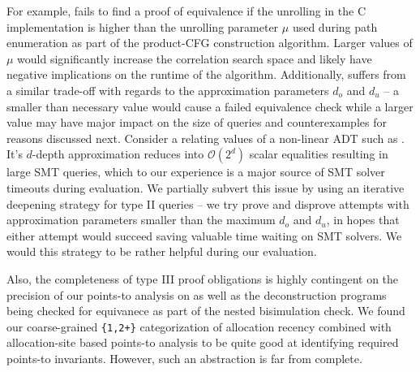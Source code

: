 For example, \toolName{} fails to find a proof of equivalence if the unrolling
in the C implementation is higher than the unrolling parameter $\mu$ used during path
enumeration as part of the product-CFG construction algorithm.
Larger values of $\mu$ would significantly increase the correlation search space and likely
have negative implications on the runtime of the algorithm.
Additionally, \toolName{} suffers from a similar trade-off with regards to the approximation parameters $d_o$ and $d_u$
-- a smaller than necessary value would cause a failed equivalence check while a larger value may
have major impact on the size of queries and counterexamples for reasons discussed next.
Consider a \recursiveRelation{} relating values of a non-linear ADT such as .
It's $d$-depth approximation reduces into $\mathcal{O}(2^d)$ scalar equalities resulting in large SMT queries,
which to our experience is a major source of SMT solver timeouts during evaluation.
We partially subvert this issue by using an iterative deepening strategy for type II queries --
we try prove and disprove attempts with approximation parameters smaller than the maximum $d_o$ and $d_u$,
in hopes that either attempt would succeed saving valuable
time waiting on SMT solvers.
We would this strategy to be rather helpful during our evaluation.

Also, the completeness of type III proof obligations is highly contingent on the precision
of our points-to analysis on \cprog{} as well as the deconstruction programs being
checked for equivanece as part of the nested bisimulation check.
We found our coarse-grained {\tt \{1,2+\}} categorization of allocation recency
combined with allocation-site based points-to analysis to be quite good at
identifying required points-to invariants.
However, such an abstraction is far from complete.